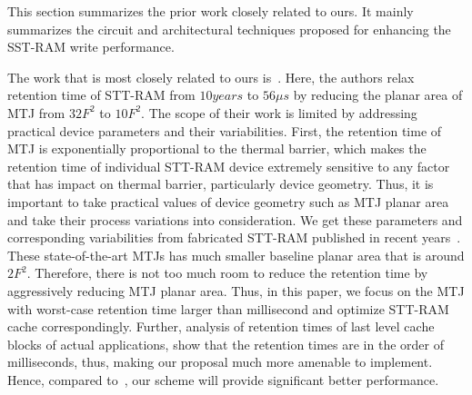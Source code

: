 

 This section summarizes the prior work closely related to ours. It mainly summarizes the circuit and
 architectural techniques proposed for enhancing the SST-RAM write performance.

The work that is most closely related to ours is~\cite{STTRAM:HPCA11}.
Here, the authors relax retention time of STT-RAM from $10 years$ to $56 \mu s$ by
reducing the planar area of MTJ from $32F^2$ to $10F^2$. The scope of their work is limited by
addressing practical device parameters and their variabilities. First, the retention time of MTJ is
exponentially proportional to the thermal barrier, which makes the retention time of individual
STT-RAM device extremely sensitive to any factor that has impact on thermal barrier, particularly
device geometry. Thus, it is important to take practical values of device geometry such as MTJ planar
area and take their process variations into consideration. We get these parameters and corresponding
variabilities from fabricated STT-RAM published in recent
years~\cite{PMTJ:Toshiba08,STTRAM:EDL11,STTRAM:Qualcomm09,STTRAM:Grandis11}. These state-of-the-art
MTJs has much smaller baseline planar area that is around $2F^2$. Therefore, there is not too much
room to reduce the retention time by aggressively reducing MTJ planar area. Thus, in this paper, we focus
on the MTJ with worst-case retention time larger than millisecond and optimize STT-RAM cache
correspondingly. Further, analysis of retention times of last level cache blocks of actual
applications, show that the retention times are in the order of milliseconds, thus, making our
proposal much more amenable to implement. Hence, compared to~\cite{STTRAM:HPCA11}, our scheme will
provide significant better performance.

